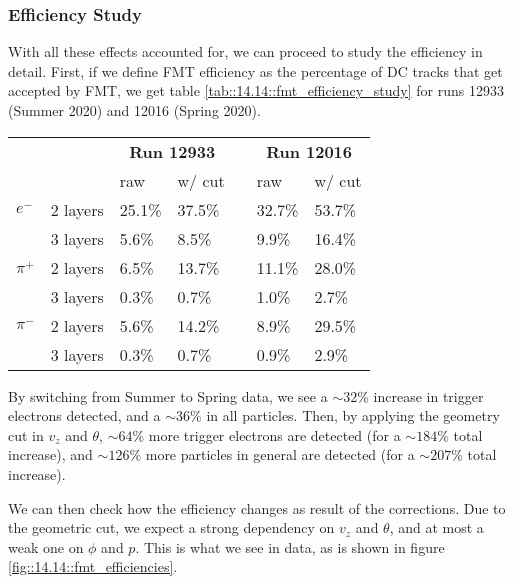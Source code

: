 \subsubsection{Efficiency Study}
\label{14.14::efficiency_study}
    With all these effects accounted for, we can proceed to study the efficiency in detail.
    First, if we define FMT efficiency as the percentage of DC tracks that get accepted by FMT, we get table \ref{tab::14.14::fmt_efficiency_study} for runs 12933 (Summer 2020) and 12016 (Spring 2020).

    \begin{center}
        \begin{tabularx}{0.60\textwidth}{llllcll}
            \toprule
            & & \multicolumn{2}{c}{\textbf{Run 12933}}  & & \multicolumn{2}{c}{\textbf{Run 12016}} \\
                             &          & raw  & w/ cut   & & raw  & w/ cut   \\
            \midrule \midrule
            \textbf{$e^-$}   & 2 layers & 25.1\% & 37.5\% & & 32.7\% & 53.7\% \\
                             & 3 layers &  5.6\% &  8.5\% & &  9.9\% & 16.4\% \\
            \midrule
            \textbf{$\pi^+$} & 2 layers &  6.5\% & 13.7\% & & 11.1\% & 28.0\% \\
                             & 3 layers &  0.3\% &  0.7\% & &  1.0\% &  2.7\% \\
            \midrule
            \textbf{$\pi^-$} & 2 layers &  5.6\% & 14.2\% & &  8.9\% & 29.5\% \\
                             & 3 layers &  0.3\% &  0.7\% & &  0.9\% &  2.9\% \\
            \bottomrule
        \end{tabularx}
        \label{tab::14.14::fmt_efficiency_study}
    \end{center}

    By switching from Summer to Spring data, we see a $\sim32\%$ increase in trigger electrons detected, and a $\sim36\%$ in all particles.
    Then, by applying the geometry cut in $v_z$ and $\theta$, $\sim64\%$ more trigger electrons are detected (for a $\sim184\%$ total increase), and $\sim126\%$ more particles in general are detected (for a $\sim207\%$ total increase).

    We can then check how the efficiency changes as result of the corrections.
    Due to the geometric cut, we expect a strong dependency on $v_z$ and $\theta$, and at most a weak one on $\phi$ and $p$.
    This is what we see in data, as is shown in figure \ref{fig::14.14::fmt_efficiencies}.

